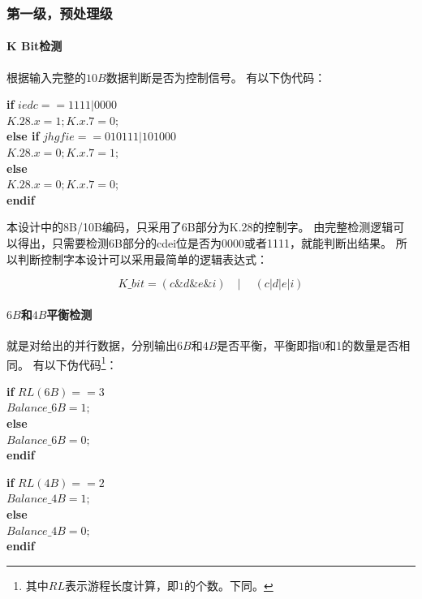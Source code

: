\documentclass[UTF8]{ctexart}
\newcommand\kw{\textbf}
\begin{document}
\subsubsection{第一级，预处理级}

\paragraph{K Bit检测}

根据输入完整的$10B$数据判断是否为控制信号。
有以下伪代码：

\begin{tabbing}
\qquad\=\kw{if} $iedc==1111|0000$ \\
      \>\qquad$K.28.x=1;K.x.7=0;$ \\
      \>\kw{else if} $jhgfie==010111|101000$ \\
      \>\qquad$K.28.x=0;K.x.7=1;$ \\
      \>\kw{else} \\
      \>\qquad$K.28.x=0;K.x.7=0;$ \\
      \>\kw{endif}
\end{tabbing}

本设计中的8B/10B编码，只采用了6B部分为K.28的控制字。
由完整检测逻辑可以得出，只需要检测6B部分的cdei位是否为0000或者1111，就能判断出结果。
所以判断控制字本设计可以采用最简单的逻辑表达式：

$$K\_bit = (c \& d \& e \& i)\quad|\quad~(c | d | e | i)$$

\paragraph{$6B$和$4B$平衡检测}

就是对给出的并行数据，分别输出$6B$和$4B$是否平衡，平衡即指0和1的数量是否相同。
有以下伪代码\footnote{其中$RL$表示游程长度计算，即$1$的个数。下同。}：

\begin{tabbing}
\qquad\=\kw{if} $RL(6B)==3$ \\
      \>\qquad$Balance\_6B=1;$ \\
      \>\kw{else} \\
      \>\qquad$Balance\_6B=0;$ \\
      \>\kw{endif}
\end{tabbing}

\begin{tabbing}
\qquad\=\kw{if} $RL(4B)==2$ \\
      \>\qquad$Balance\_4B=1;$ \\
      \>\kw{else} \\
      \>\qquad$Balance\_4B=0;$ \\
      \>\kw{endif}
\end{tabbing}
\end{document}
